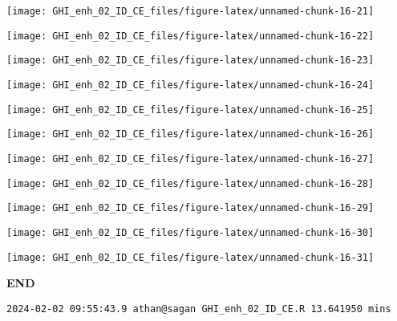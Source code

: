 \documentclass[
  10pt,
  a4paper,oneside]{article}
\begin{document}
\begin{center}\texttt{[image: GHI\_enh\_02\_ID\_CE\_files/figure-latex/unnamed-chunk-16-21]} \end{center}

\begin{center}\texttt{[image: GHI\_enh\_02\_ID\_CE\_files/figure-latex/unnamed-chunk-16-22]} \end{center}

\begin{center}\texttt{[image: GHI\_enh\_02\_ID\_CE\_files/figure-latex/unnamed-chunk-16-23]} \end{center}

\begin{center}\texttt{[image: GHI\_enh\_02\_ID\_CE\_files/figure-latex/unnamed-chunk-16-24]} \end{center}

\begin{center}\texttt{[image: GHI\_enh\_02\_ID\_CE\_files/figure-latex/unnamed-chunk-16-25]} \end{center}

\begin{center}\texttt{[image: GHI\_enh\_02\_ID\_CE\_files/figure-latex/unnamed-chunk-16-26]} \end{center}

\begin{center}\texttt{[image: GHI\_enh\_02\_ID\_CE\_files/figure-latex/unnamed-chunk-16-27]} \end{center}

\begin{center}\texttt{[image: GHI\_enh\_02\_ID\_CE\_files/figure-latex/unnamed-chunk-16-28]} \end{center}

\begin{center}\texttt{[image: GHI\_enh\_02\_ID\_CE\_files/figure-latex/unnamed-chunk-16-29]} \end{center}

\begin{center}\texttt{[image: GHI\_enh\_02\_ID\_CE\_files/figure-latex/unnamed-chunk-16-30]} \end{center}

\begin{center}\texttt{[image: GHI\_enh\_02\_ID\_CE\_files/figure-latex/unnamed-chunk-16-31]} \end{center}

\textbf{END}

\begin{verbatim}
2024-02-02 09:55:43.9 athan@sagan GHI_enh_02_ID_CE.R 13.641950 mins
\end{verbatim}
\end{document}
